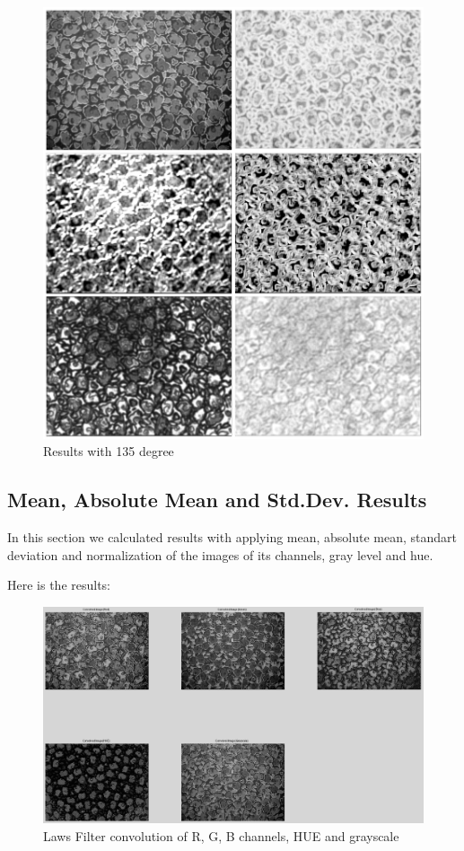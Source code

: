 \documentclass{article}
\begin{document}
\begin{figure}[H]
\begin{center}
\includegraphics[scale=0.35]{result4.jpeg}
\caption{Results with 135 degree}
\end{center}
\end{figure}	

\subsection{Mean, Absolute Mean and Std.Dev. Results}
In this section we calculated results with applying mean, absolute mean, standart deviation and normalization of the images of its channels, gray level and hue.

Here is the results:

\begin{figure}[H]
\begin{center}
\includegraphics[scale=0.3]{lawsFilter.png}
\caption{Laws Filter convolution of R, G, B channels, HUE and grayscale}
\end{center}
\end{figure}	
\end{document}
